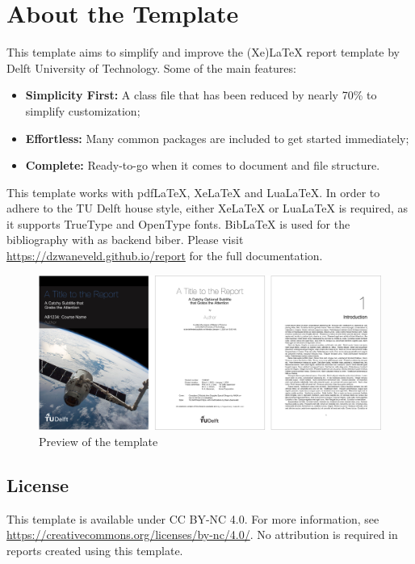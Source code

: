 \chapter{About the Template}

This template aims to simplify and improve the (Xe)LaTeX report template by Delft University of Technology. Some of the main features:

\begin{itemize}
  \item \textbf{Simplicity First:} A class file that has been reduced by nearly 70\% to simplify customization;
  \item \textbf{Effortless:} Many common packages are included to get started immediately;
  \item \textbf{Complete:} Ready-to-go when it comes to document and file structure.
\end{itemize}

\noindent This template works with pdfLaTeX, XeLaTeX and LuaLaTeX. In order to adhere to the TU Delft house style, either XeLaTeX or LuaLaTeX is required, as it supports TrueType and OpenType fonts. BibLaTeX is used for the bibliography with as backend biber. Please visit \url{https://dzwaneveld.github.io/report} for the full documentation.

\begin{figure}[h]
    \centering
    \includegraphics[width=0.95\linewidth]{figures/template.png}
    \caption{Preview of the template}
\end{figure}

\section*{License}

\noindent This template is available under CC BY-NC 4.0. For more information, see \url{https://creativecommons.org/licenses/by-nc/4.0/}. No attribution is required in reports created using this template.
